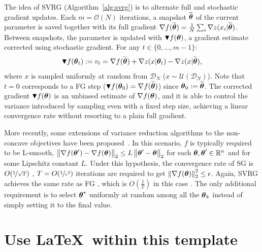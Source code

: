 The idea of SVRG (Algorithm~\ref{alg:svrg}) is to alternate full and stochastic gradient updates. 
Each $m = \mathcal{O}(N)$ iterations, a snapshot $\widetilde{\vtheta}$ of the current parameter is saved together with its full gradient $\nabla f(\widetilde{\vtheta}) = \frac{1}{N} \sum_i \nabla z(x_i|\widetilde{\vtheta})$.
Between snapshots, the parameter is updated with $\blacktriangledown f(\vtheta)$, a gradient estimate corrected using stochastic gradient. For any $t \in \{0,\ldots,m-1\}$:
\begin{equation}\label{E:svrg.gradient.correction}
        \blacktriangledown f(\vtheta_{t}) := v_t = \nabla f(\wt{\vtheta}) + \nabla z(x | \vtheta_t) - \nabla z(x | \wt{\vtheta}),
\end{equation} 
where $x$ is sampled uniformly at random from $\mathcal{D}_N$ (\ie $x \sim \mathcal{U}(\mathcal{D}_N)$).
Note that $t=0$ corresponds to a FG step (\ie $\blacktriangledown f(\vtheta_0) = \nabla f(\wt{\vtheta})$) since $\vtheta_0 := \wt{\vtheta}$.
The corrected gradient $\blacktriangledown f(\vtheta)$ is an unbiased estimate of $\nabla f(\vtheta)$, and it is able to control the variance introduced by sampling even with a fixed step size, achieving a linear convergence rate without resorting to a plain full gradient.

More recently, some extensions of variance reduction algorithms to the non-concave objectives have been proposed~\citep[\eg][]{allen2016variance,reddi2016stochastic,reddi2016fast}. In this scenario, $f$ is typically required to be L-smooth, \ie $\norm[2]{\nabla f(\vtheta') - \nabla f(\vtheta)} \leq L\norm[2]{\vtheta'-\vtheta}$ for each $\vtheta,\vtheta'\in\realspace^n$ and for some Lipschitz constant $L$. Under this hypothesis, the convergence rate of SG is $O(\nicefrac{1}{\sqrt{T}})$ \cite{ghadimi2013stochastic}, \ie $T=O(\nicefrac{1}{\epsilon^2})$ iterations are required to get $\norm[2]{\nabla f(\vtheta)}^2\leq\epsilon$. Again, SVRG achieves the same rate as FG \cite{reddi2016stochastic}, which is $O(\frac{1}{T})$ in this case \cite{nesterov2013introductory}. The only additional requirement is to select $\vtheta^*$ uniformly at random among all the $\vtheta_k$ instead of simply setting it to the final value.

\vspace{-0.05in}

\section{Use \LaTeX\ within this template}

